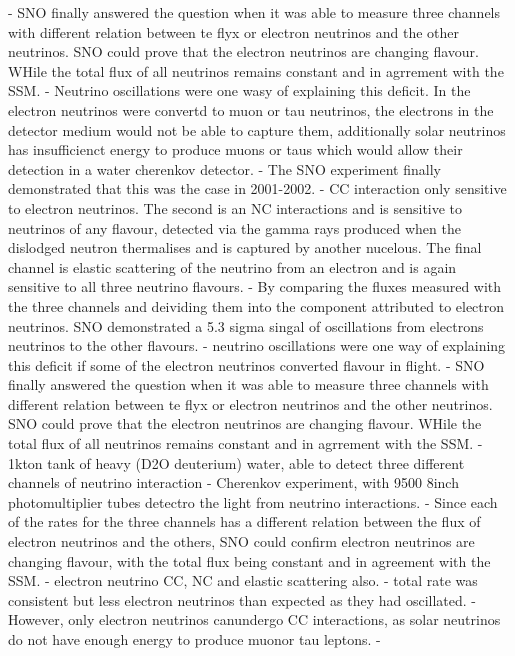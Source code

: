 - SNO finally answered the question when it was able to measure three channels with different relation between te flyx or
electron neutrinos and the other neutrinos. SNO could prove that the electron neutrinos are changing flavour.
WHile the total flux of all neutrinos remains constant and in agrrement with the SSM.
- Neutrino oscillations were one wasy of explaining this deficit. In the electron neutrinos were convertd to
muon or tau neutrinos, the electrons in the detector medium would not be able to capture them, additionally
solar neutrinos has insufficienct energy to produce muons or taus which would allow their detection in a water cherenkov detector.
- The SNO experiment finally demonstrated that this was the case in 2001-2002.
- %
CC interaction only sensitive to electron neutrinos. The second is an NC interactions and is sensitive to neutrinos
of any flavour, detected via the gamma rays produced when the dislodged neutron thermalises and is captured by another nucelous.
The final channel is elastic scattering of the neutrino from an electron and is again sensitive to all three neutrino flavours.
- By comparing the fluxes measured with the three channels and deividing them into the component attributed to electron neutrinos.
SNO demonstrated a 5.3 sigma singal of oscillations from electrons neutrinos to the other flavours.
- neutrino oscillations were one way of explaining this deficit if some of the electron neutrinos converted flavour in flight.
- SNO finally answered the question when it was able to measure three channels with different relation between te flyx or electron neutrinos and the other neutrinos. SNO could prove that the electron neutrinos are changing flavour. WHile the total flux of all neutrinos remains constant and in agrrement with the SSM.
- 1kton tank of heavy (D2O deuterium) water, able to detect three different channels of neutrino interaction
- Cherenkov experiment, with 9500 8inch photomultiplier tubes detectro the light from neutrino interactions.
- Since each of the rates for the three channels has a different relation between the flux of electron neutrinos and the others, SNO could confirm electron neutrinos are changing flavour, with the total flux being constant and in agreement with the SSM.
- electron neutrino CC, NC and elastic scattering also.
- total rate was consistent but less electron neutrinos than expected as they had oscillated.
- However, only electron neutrinos canundergo CC interactions, as solar neutrinos do not have enough energy to produce muonor tau leptons.
- %

